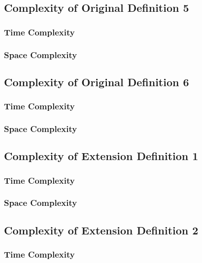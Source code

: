 \documentclass[conference]{IEEEtran}
\begin{document}
\subsection{Complexity of Original Definition 5}

\subsubsection{Time Complexity}

\subsubsection{Space Complexity}

\subsection{Complexity of Original Definition 6}

\subsubsection{Time Complexity}

\subsubsection{Space Complexity}

\subsection{Complexity of Extension Definition 1}

\subsubsection{Time Complexity}

\subsubsection{Space Complexity}

\subsection{Complexity of Extension Definition 2}

\subsubsection{Time Complexity}
\end{document}
